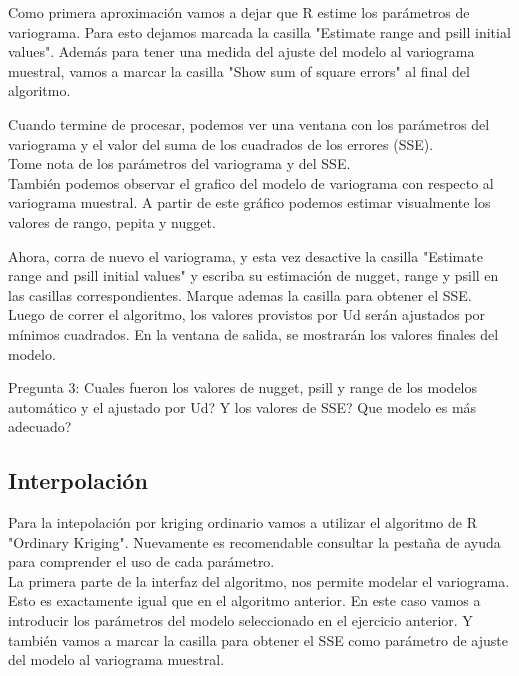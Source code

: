 \documentclass[onecolumn]{article}
\begin{document}
Como primera aproximación vamos a dejar que R estime los parámetros de variograma. Para esto dejamos marcada la casilla "Estimate range and psill initial values". Además para tener una medida del ajuste del modelo al variograma muestral, vamos a marcar la casilla "Show sum of square errors" al final del algoritmo.

Cuando termine de procesar, podemos ver una ventana con los parámetros del variograma y el valor del suma de los cuadrados de los errores (SSE). \\

Tome nota de los parámetros del variograma y del SSE.\\

También podemos observar el grafico del modelo de variograma con respecto al variograma muestral. A partir de este gráfico podemos estimar visualmente los valores de rango, pepita y nugget.

Ahora, corra de nuevo el variograma, y esta vez desactive la casilla "Estimate range and psill initial values" y escriba su estimación de nugget, range y psill en las casillas correspondientes. Marque ademas la casilla para obtener el SSE. Luego de correr el algoritmo, los valores provistos por Ud serán ajustados por mínimos cuadrados. En la ventana de salida, se mostrarán los valores finales del modelo.

\begin{mdframed}[]
	Pregunta 3: Cuales fueron los valores de nugget, psill y range de los modelos automático y el ajustado por Ud? Y los valores de SSE? Que modelo es más adecuado?
\end{mdframed}

\subsection{Interpolación}

Para la intepolación por kriging ordinario vamos a utilizar el algoritmo de R "Ordinary Kriging". Nuevamente es recomendable consultar la pestaña de ayuda para comprender el uso de cada parámetro. \\

La primera parte de la interfaz del algoritmo, nos permite modelar el variograma. Esto es exactamente igual que en el algoritmo anterior. En este caso vamos a introducir los parámetros del modelo seleccionado en el ejercicio anterior. Y también vamos a marcar la casilla para obtener el SSE como parámetro de ajuste del modelo al variograma muestral.\\
\end{document}
